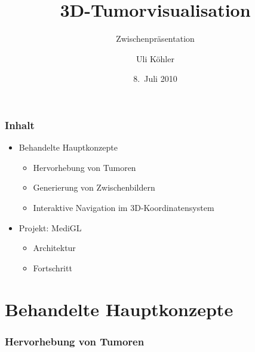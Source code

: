 \documentclass[14pt]{beamer}
\title{3D-Tumorvisualisation}
\subtitle{Zwischenpräsentation}
\author{Uli Köhler}
\institute[EMG]{Ernst-Mach-Gymnasium Haar}
\date{8.~Juli 2010}
\begin{document}
\frame{\titlepage}
\begin{frame}
   \frametitle{Inhalt}
   \begin{itemize}
    \item  Behandelte Hauptkonzepte
    \begin{itemize}
      \item Hervorhebung von Tumoren
      \item Generierung von Zwischenbildern
      \item Interaktive Navigation im 3D-Koordinatensystem
    \end{itemize}
    \pause
    \item Projekt: MediGL
    \begin{itemize}
     \item Architektur
     \item Fortschritt
    \end{itemize}
   \end{itemize}
\end{frame}
  \section{Behandelte Hauptkonzepte}
\begin{frame}
 \frametitle{Hervorhebung von Tumoren}
\begin{columns}
\end{columns}
\end{frame}
\end{document}
